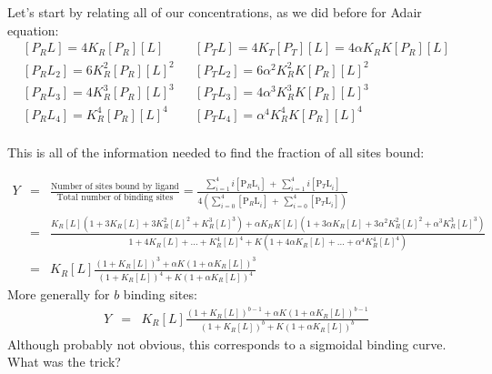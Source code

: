 \documentclass{article}
\begin{document}
Let's start by relating all of our concentrations, as we did before for Adair equation:
\begin{eqnarray*}
\left[ P_RL \right] = 4K_R \left[ P_R \right] \left[ L \right] &  & \left[ P_TL \right] = 4K_T \left[ P_T \right] \left[ L \right] = 4\alpha K_R K \left[ P_R \right] \left[ L \right]\\
\left[ P_RL_2 \right] = 6K_R^2 \left[ P_R \right] \left[ L \right]^2 &  & \left[ P_TL_2 \right] = 6\alpha^2 K_R^2 K \left[ P_R \right] \left[ L \right]^2\\
\left[ P_RL_3 \right] = 4K_R^3 \left[ P_R \right] \left[ L \right]^3 &  & \left[ P_TL_3 \right] = 4 \alpha^3 K_R^3 K \left[ P_R \right] \left[ L \right]^3\\
\left[ P_RL_4 \right] = K_R^4 \left[ P_R \right] \left[ L \right]^4 &  & \left[ P_TL_4 \right] = \alpha^4 K_R^4 K \left[ P_R \right] \left[ L \right]^4\\
\end{eqnarray*}

This is all of the information needed to find the fraction of all sites bound:

\begin{eqnarray*}
 Y & = & \frac{\textrm{Number of sites bound by ligand}}{\textrm{Total number of binding sites}} = \frac{\sum_{i=1}^4 i \left[ \textrm{P$_R$L}_i \right] \, + \, \sum_{i=1}^4 i  \left[ \textrm{P$_T$L}_i \right]}{4 \left(\sum_{i=0}^4 \left[ \textrm{P$_R$L}_i \right] \, + \, \sum_{i=0}^4 \left[ \textrm{P$_T$L}_i \right]\right)}\\
& = & \frac{K_R \left[ L \right] \left( 1 + 3 K_R\left[ L \right] + 3 K_R^2\left[ L \right]^2 + K_R^3\left[ L \right]^3\right) + \alpha K_R K \left[ L \right] \left( 1 + 3 \alpha K_R\left[ L \right] + 3 \alpha^2 K_R^2\left[ L \right]^2 + \alpha^3 K_R^3\left[ L \right]^3\right)}{1 + 4 K_R\left[ L \right] + \ldots +  K_R^4\left[ L \right]^4 + K\left( 1 + 4 \alpha K_R\left[ L \right] + \ldots +  \alpha^4 K_R^4\left[ L \right]^4 \right)}\\
& = & K_R \left[ L \right]  \frac{\left( 1 + K_R \left[ L \right]\right)^3 + \alpha K \left( 1 + \alpha K_R \left[ L \right]\right)^3}{\left( 1 + K_R \left[ L \right]\right)^4 + K \left( 1 + \alpha K_R \left[ L \right]\right)^4}
\end{eqnarray*}
More generally for $b$ binding sites:
\begin{eqnarray}
Y & = & K_R \left[ L \right]  \frac{\left( 1 + K_R \left[ L \right]\right)^{b-1} + \alpha K \left( 1 + \alpha K_R \left[ L \right]\right)^{b-1}}{\left( 1 + K_R \left[ L \right]\right)^b + K \left( 1 + \alpha K_R \left[ L \right]\right)^b}
\end{eqnarray}
Although probably not obvious, this corresponds to a sigmoidal binding curve. What was the trick?\\
\end{document}
